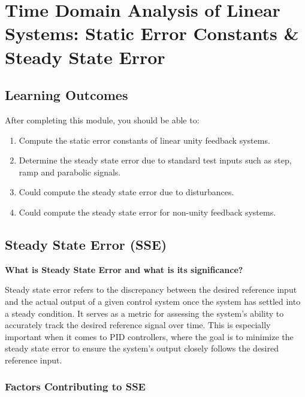 \documentclass[
  14pt,
  a4paper,
  oneside,
  open=any,
  a4paper,
  14pt]{report}
\begin{document}
\chapter{Time Domain Analysis of Linear Systems: Static Error Constants
\& Steady State
Error}\label{time-domain-analysis-of-linear-systems-static-error-constants-steady-state-error}

\section*{Learning Outcomes}\label{learning-outcomes-5}


After completing this module, you should be able to:

\begin{enumerate}
\def\labelenumi{\arabic{enumi}.}
\item
  Compute the static error constants of linear unity feedback systems.
\item
  Determine the steady state error due to standard test inputs such as
  step, ramp and parabolic signals.
\item
  Could compute the steady state error due to disturbances.
\item
  Could compute the steady state error for non-unity feedback systems.
\end{enumerate}

\section{Steady State Error (SSE)}\label{steady-state-error-sse}

\textbf{What is Steady State Error and what is its significance?}

Steady state error refers to the discrepancy between the desired
reference input and the actual output of a given control system once the
system has settled into a steady condition. It serves as a metric for
assessing the system's ability to accurately track the desired reference
signal over time. This is especially important when it comes to PID
controllers, where the goal is to minimize the steady state error to
ensure the system's output closely follows the desired reference input.

\subsection{Factors Contributing to
SSE}\label{factors-contributing-to-sse}
\end{document}
